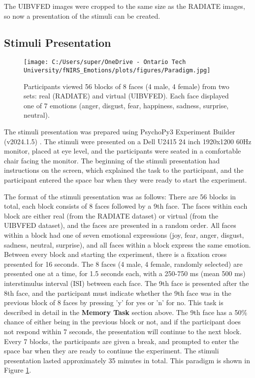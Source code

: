 The UIBVFED images were cropped to the same size as the RADIATE images, so now a presentation of the stimuli can be created. 

\subsection{Stimuli Presentation}
\begin{figure}[H]
    \centering
    \texttt{[image: C:/Users/super/OneDrive - Ontario Tech University/fNIRS\_Emotions/plots/figures/Paradigm.jpg]}
    \caption{Participants viewed 56 blocks of 8 faces (4 male, 4 female) from two sets:
    real (RADIATE) and virtual (UIBVFED). Each face displayed one of 7 emotions (anger, disgust, fear, happiness, sadness, surprise, neutral). }
    \label{fig:paradigm}
\end{figure}
The stimuli presentation was prepared using PsychoPy3 Experiment Builder (v2024.1.5) \citep{peirce_psychopy2_2019}. 
The stimuli were presented on a Dell U2415 24 inch 1920x1200 60Hz monitor, placed at eye level, and the participants were seated in a comfortable chair facing the monitor.
The beginning of the stimuli presentation had instructions on the screen, which explained the task to the participant, and the participant entered the space bar when they were ready to start the experiment.

The format of the stimuli presentation was as follows: There are 56 blocks in total, each block consists of 8 faces followed by a 9th face.
The faces within each block are either real (from the RADIATE dataset) or virtual (from the UIBVFED dataset), and the faces are presented in a random order.
All faces within a block had one of seven emotional expressions (joy, fear, anger, disgust, sadness, neutral, surprise), and all faces within a block express the same emotion. 
Between every block and starting the experiment, there is a fixation cross presented for 16 seconds. 
The 8 faces (4 male, 4 female, randomly selected) are presented one at a time, for 1.5 seconds each, with a 250-750 ms (mean 500 ms) interstimulus interval (ISI) between each face. 
The 9th face is presented after the 8th face, and the participant must indicate whether the 9th face was in the previous block of 8 faces by pressing 'y' for yes or 'n' for no. 
This task is described in detail in the \textbf{Memory Task} section above. 
The 9th face has a 50\% chance of either being in the previous block or not, and if the participant does not respond within 7 seconds, the presentation will continue to the next block.
Every 7 blocks, the participants are given a break, and prompted to enter the space bar when they are ready to continue the experiment.
The stimuli presentation lasted approximately 35 minutes in total. 
This paradigm is shown in Figure \ref{fig:paradigm}.

